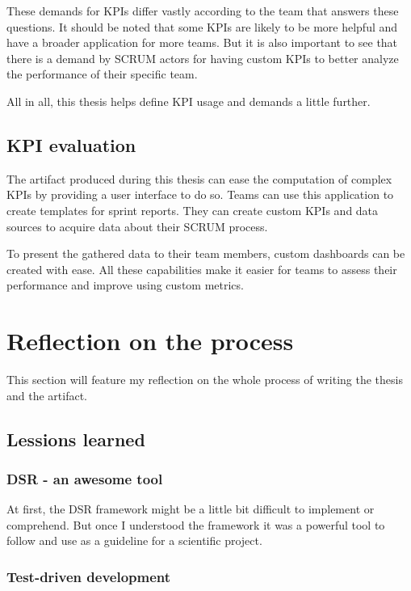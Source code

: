 These demands for KPIs differ vastly according to the team that answers these questions. 
It should be noted that some KPIs are likely to be more helpful and have a broader application for more teams. 
But it is also important to see that there is a demand by SCRUM actors for having custom KPIs to better analyze the performance of their specific team. 

All in all, this thesis helps define KPI usage and demands a little further.

\subsection{KPI evaluation}

The artifact produced during this thesis can ease the computation of complex KPIs by providing a user interface to do so. 
Teams can use this application to create templates for sprint reports. 
They can create custom KPIs and data sources to acquire data about their SCRUM process. 

To present the gathered data to their team members, custom dashboards can be created with ease. 
All these capabilities make it easier for teams to assess their performance and improve using custom metrics.


\section{Reflection on the process}

This section will feature my reflection on the whole process of writing the thesis and the artifact.

\subsection{Lessions learned}

\subsubsection*{DSR - an awesome tool}

At first, the DSR framework might be a little bit difficult to implement or comprehend.
But once I understood the framework it was a powerful tool to follow and use as a guideline for a scientific project. 

\subsubsection*{Test-driven development}

